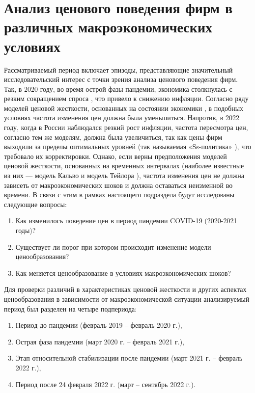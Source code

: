 \section{Анализ ценового поведения фирм в различных макроэкономических условиях}\label{sec:ch3/sec4}


Рассматриваемый период включает эпизоды, представляющие значительный исследовательский интерес с точки зрения анализа ценового поведения фирм. Так, в 2020 году, во время острой фазы пандемии, экономика столкнулась с резким сокращением спроса \cite{CBR2020}, что привело к снижению инфляции. Согласно ряду моделей ценовой жесткости, основанных на состоянии экономики \cite{CaplinSpulber1987, golosov2007}, в подобных условиях частота изменения цен должна была уменьшиться. Напротив, в 2022 году, когда в России наблюдался резкий рост инфляции, частота пересмотра цен, согласно тем же моделям, должна была увеличиться, так как цены фирм выходили за пределы оптимальных уровней (так называемая «Ss-политика» \cite{SheshinskiWeiss1977, Sheshinski1983}), что требовало их корректировки. Однако, если верны предположения моделей ценовой жесткости, основанных на временных интервалах (наиболее известные из них — модель Кальво \cite{Calvo1983} и модель Тейлора \cite{Taylor1980}), частота изменения цен не должна зависеть от макроэкономических шоков и должна оставаться неизменной во времени. В связи с этим в рамках настоящего подраздела будут исследованы следующие вопросы:

\begin{enumerate}
	\item Как изменилось поведение цен в период пандемии COVID-19 (2020-2021 годы)?
	\item Существует ли порог при котором происходит изменение модели ценообразования?
	\item Как меняется ценообразование в условиях макроэкономических шоков?
\end{enumerate}

Для проверки различий в характеристиках ценовой жесткости и других аспектах ценообразования в зависимости от макроэкономической ситуации анализируемый период был разделен на четыре подпериода:
\begin{enumerate}
	\item Период до пандемии (февраль 2019 – февраль 2020 г.),
	\item Острая фаза пандемии (март 2020 г. – февраль 2021 г.),
	\item Этап относительной стабилизации после пандемии (март 2021 г. – февраль 2022 г.),
	\item Период после 24 февраля 2022 г. (март – сентябрь 2022 г.).
\end{enumerate}


